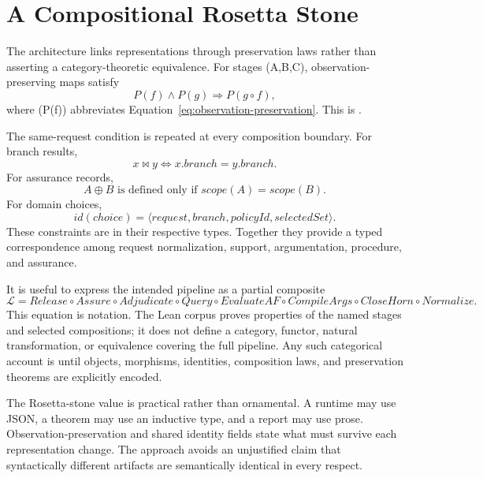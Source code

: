 \section{A Compositional Rosetta Stone}
\label{sec:rosetta}

The architecture links representations through preservation laws rather than asserting a category-theoretic equivalence. For stages (A,B,C), observation-preserving maps satisfy
\begin{equation}
P(f)\land P(g)\Longrightarrow P(g\circ f),
\label{eq:preservation-composition}
\end{equation}
where (P(f)) abbreviates Equation~\eqref{eq:observation-preservation}. This is \formalized{}.

The same-request condition is repeated at every composition boundary. For branch results,
\begin{equation}
x\bowtie y\iff x.branch=y.branch.
\label{eq:branch-join}
\end{equation}
For assurance records,
\begin{equation}
A\oplus B\text{ is defined only if }scope(A)=scope(B).
\label{eq:scope-join}
\end{equation}
For domain choices,
\begin{equation}
id(choice)=\langle request,branch,policyId,selectedSet\rangle.
\label{eq:choice-identity}
\end{equation}
These constraints are \formalized{} in their respective types. Together they provide a typed correspondence among request normalization, support, argumentation, procedure, and assurance.

It is useful to express the intended pipeline as a partial composite
\begin{equation}
\mathcal L=
Release\circ Assure\circ Adjudicate\circ Query\circ
EvaluateAF\circ CompileArgs\circ CloseHorn\circ Normalize.
\label{eq:pipeline-composite}
\end{equation}
This equation is \derived{} notation. The Lean corpus proves properties of the named stages and selected compositions; it does not define a category, functor, natural transformation, or equivalence covering the full pipeline. Any such categorical account is \conjectured{} until objects, morphisms, identities, composition laws, and preservation theorems are explicitly encoded.

The Rosetta-stone value is practical rather than ornamental. A runtime may use JSON, a theorem may use an inductive type, and a report may use prose. Observation-preservation and shared identity fields state what must survive each representation change. The approach avoids an unjustified claim that syntactically different artifacts are semantically identical in every respect.

